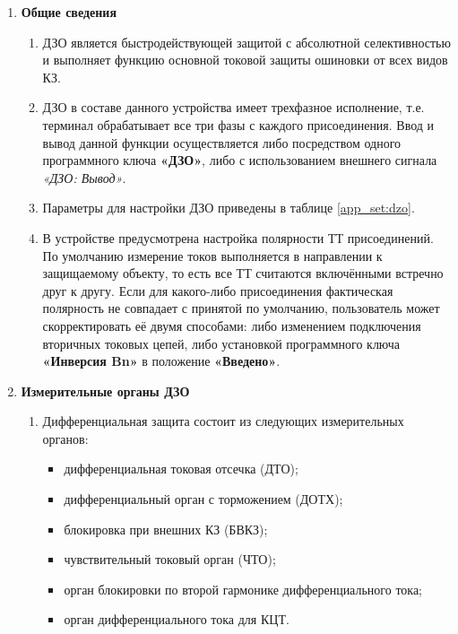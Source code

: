 \color{black}

\begin{enumerate}

\item \textbf{Общие сведения}

\begin{enumerate}

\item
ДЗО является быстродействующей защитой с абсолютной селективностью и выполняет функцию основной токовой защиты ошиновки от всех видов КЗ.

\item
ДЗО в составе данного устройства имеет трехфазное исполнение, т.е. терминал обрабатывает все три фазы с каждого присоединения. Ввод и вывод данной функции осуществляется либо посредством одного программного ключа \textbf{«ДЗО»}, либо с использованием внешнего сигнала \textit{«ДЗО: Вывод»}.

\item
Параметры для настройки ДЗО приведены в таблице \ref{app_set:dzo}.

\item
В устройстве предусмотрена настройка полярности ТТ присоединений. По умолчанию измерение токов выполняется в направлении к защищаемому объекту, то есть все ТТ считаются включёнными встречно друг к другу. Если для какого-либо присоединения фактическая полярность не совпадает с принятой по умолчанию, пользователь может скорректировать её двумя способами: либо изменением подключения вторичных токовых цепей, либо установкой программного ключа \textbf{«Инверсия Bn»} в положение \textbf{«Введено»}.

\end{enumerate}

\item \textbf{Измерительные органы ДЗО}

\begin{enumerate}

\item
Дифференциальная защита состоит из следующих измерительных органов:
\begin{itemize} 
\item дифференциальная токовая отсечка (ДТО);
\item дифференциальный орган с торможением (ДОТХ);
\item блокировка при внешних КЗ (БВКЗ);
\item чувствительный токовый орган (ЧТО);
\item орган блокировки по второй гармонике дифференциального тока;
\item орган дифференциального тока для КЦТ.
\end{itemize}


\end{enumerate}
\end{enumerate}

